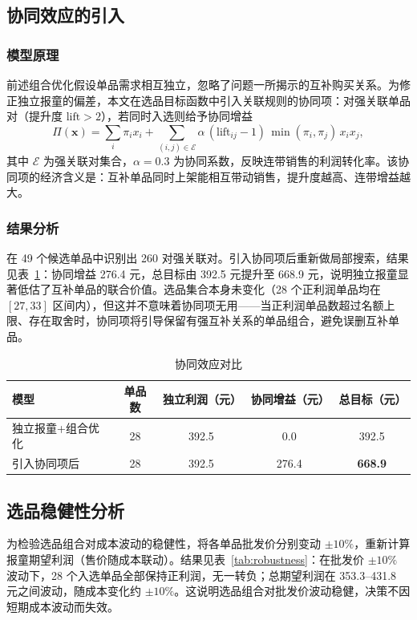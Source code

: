 \documentclass[12pt]{ctexart}
\begin{document}
\subsection{协同效应的引入}

\subsubsection{模型原理}
前述组合优化假设单品需求相互独立，忽略了问题一所揭示的互补购买关系。为修正独立报童的偏差，本文在选品目标函数中引入关联规则的协同项：对强关联单品对（提升度 $\mathrm{lift}>2$），若同时入选则给予协同增益
\begin{equation}
\Pi(\mathbf{x}) = \sum_i \pi_i x_i + \sum_{(i,j)\in\mathcal{E}} \alpha\,(\mathrm{lift}_{ij}-1)\,\min(\pi_i,\pi_j)\,x_i x_j,
\end{equation}
其中 $\mathcal{E}$ 为强关联对集合，$\alpha=0.3$ 为协同系数，反映连带销售的利润转化率。该协同项的经济含义是：互补单品同时上架能相互带动销售，提升度越高、连带增益越大。

\subsubsection{结果分析}
在 49 个候选单品中识别出 260 对强关联对。引入协同项后重新做局部搜索，结果见表~\ref{tab:synergy}：协同增益 276.4 元，总目标由 392.5 元提升至 668.9 元，说明独立报童显著低估了互补单品的联合价值。选品集合本身未变化（28 个正利润单品均在 $[27,33]$ 区间内），但这并不意味着协同项无用——当正利润单品数超过名额上限、存在取舍时，协同项将引导保留有强互补关系的单品组合，避免误删互补单品。

\begin{table}[htbp]
\centering
\caption{协同效应对比}
\label{tab:synergy}
\begin{tabular}{lcccc}
\toprule
模型 & 单品数 & 独立利润（元） & 协同增益（元） & 总目标（元） \\
\midrule
独立报童+组合优化 & 28 & 392.5 & 0.0 & 392.5 \\
引入协同项后 & 28 & 392.5 & 276.4 & \textbf{668.9} \\
\bottomrule
\end{tabular}
\end{table}

\subsection{选品稳健性分析}
为检验选品组合对成本波动的稳健性，将各单品批发价分别变动 $\pm10\%$，重新计算报童期望利润（售价随成本联动）。结果见表~\ref{tab:robustness}：在批发价 $\pm10\%$ 波动下，28 个入选单品全部保持正利润，无一转负；总期望利润在 353.3--431.8 元之间波动，随成本变化约 $\pm10\%$。这说明选品组合对批发价波动稳健，决策不因短期成本波动而失效。
\end{document}
